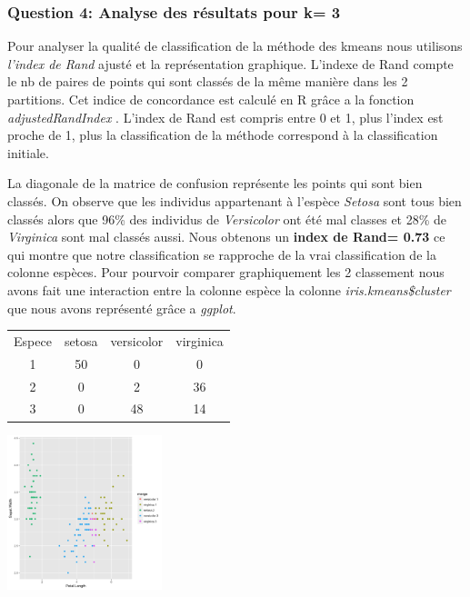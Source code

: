 \documentclass[10pt]{article}
\begin{document}
 \subsubsection{ Question 4: Analyse des résultats pour k= 3}
Pour analyser la qualité de classification de la méthode des kmeans nous utilisons\textit{ l'index de Rand} ajusté et la représentation graphique. L'indexe de Rand compte le nb de paires de points qui sont classés de la même manière dans les 2 partitions. Cet indice de concordance est calculé en R grâce a la fonction \textit{adjustedRandIndex} . L'index de Rand est compris entre 0 et 1, plus l'index est proche de 1, plus la classification de la méthode correspond à la classification initiale.\

La diagonale de la matrice de confusion représente les points qui sont bien classés. On observe que les individus appartenant à l'espèce \textit{Setosa} sont tous bien classés alors que 96\% des individus de \textit{Versicolor} ont été mal classes et 28\% de \textit{Virginica} sont mal classés aussi.  Nous obtenons un \textbf{index de Rand= 0.73 } ce qui montre que notre classification se rapproche de la vrai classification de la colonne espèces.
Pour pourvoir comparer graphiquement les 2 classement nous avons fait une interaction entre la colonne espèce la colonne \textit{iris.kmeans\$cluster} que nous avons représenté grâce a \textit{ggplot}. 

	\begin{minipage}{.5\textwidth}
		\begin{tabular}{c c c c}	
			Espece &setosa & versicolor & virginica\\
			1     &  50     &     0    &     0\\
			2     & 0       &   2      &  36\\
			3     & 0    &     48   &     14
		\end{tabular}
\end{minipage}%
\hspace{0.08\linewidth}
\begin{minipage}{.5\textwidth}
	\includegraphics[width=45mm]{Figures/Iris_2/interaction.png}
	\label{fig:interaction}
\end{minipage}
\vspace{0.1mm}\\
\end{document}
